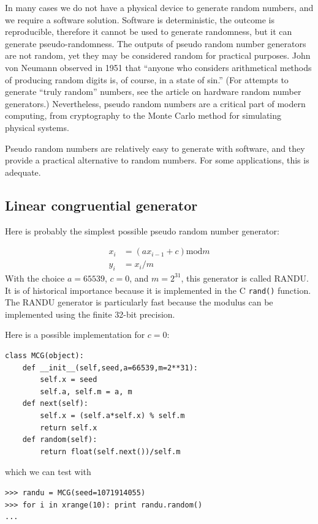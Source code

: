 \documentclass[justified,sixbynine]{tufte-book}
\def\ft{\small\tt}
\theoremstyle{plain}%
\theoremstyle{definition}
\theoremstyle{remark}
\begin{document}
\begin{fullwidth}
In many cases we do not have a physical device to generate random numbers,
and we require a software solution. Software is deterministic, the outcome
is reproducible, therefore it cannot be used to generate randomness, but it
can generate pseudo-randomness. The outputs of pseudo random number
generators are not random, yet they may be considered random for practical purposes.
John von Neumann observed in 1951 that ``anyone who
considers arithmetical methods of producing random digits is, of course, in
a state of sin.'' (For attempts to generate ``truly random'' numbers, see
the article on hardware random number generators.) Nevertheless,
pseudo random numbers are a critical part of modern computing, from
cryptography to the Monte Carlo method for simulating physical systems.

Pseudo random numbers are relatively easy to generate with software, and they
provide a practical alternative to random numbers. For some applications,
this is adequate.



\goodbreak\subsection{Linear congruential generator}

Here is probably the simplest possible pseudo random number generator:

\begin{align}
x_i &= (a x_{i-1} + c) \textrm{mod}m \\
y_i &= x_i/m
\end{align}
With the choice $a=65539$, $c=0$, and $m=2^{31}$, this generator is called RANDU. It is of historical importance
because it is implemented in the C {\ft rand()} function.
The RANDU generator is particularly fast because the modulus can
be implemented using the finite 32-bit precision.

Here is a possible implementation for $c=0$:
\begin{lstlisting}[caption={in file: {\ft nlib.py}}]
class MCG(object):
    def __init__(self,seed,a=66539,m=2**31):
        self.x = seed
        self.a, self.m = a, m
    def next(self):
        self.x = (self.a*self.x) % self.m
        return self.x
    def random(self):
        return float(self.next())/self.m
\end{lstlisting}

which we can test with
\begin{lstlisting}
>>> randu = MCG(seed=1071914055)
>>> for i in xrange(10): print randu.random()
...
\end{lstlisting}


\end{fullwidth}
\end{document}
